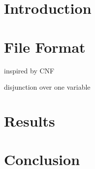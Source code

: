 \section{Introduction}



\section{File Format}

inspired by CNF

disjunction over one variable



\section{Results}



\section{Conclusion}


